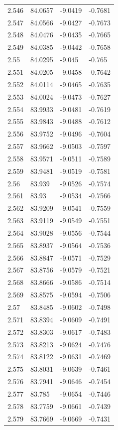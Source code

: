 \begin{tabular}{llll}
2.546 & 84.0657 & -9.0419 & -0.7681 \\
2.547 & 84.0566 & -9.0427 & -0.7673 \\
2.548 & 84.0476 & -9.0435 & -0.7665 \\
2.549 & 84.0385 & -9.0442 & -0.7658 \\
2.55 & 84.0295 & -9.045 & -0.765 \\
2.551 & 84.0205 & -9.0458 & -0.7642 \\
2.552 & 84.0114 & -9.0465 & -0.7635 \\
2.553 & 84.0024 & -9.0473 & -0.7627 \\
2.554 & 83.9933 & -9.0481 & -0.7619 \\
2.555 & 83.9843 & -9.0488 & -0.7612 \\
2.556 & 83.9752 & -9.0496 & -0.7604 \\
2.557 & 83.9662 & -9.0503 & -0.7597 \\
2.558 & 83.9571 & -9.0511 & -0.7589 \\
2.559 & 83.9481 & -9.0519 & -0.7581 \\
2.56 & 83.939 & -9.0526 & -0.7574 \\
2.561 & 83.93 & -9.0534 & -0.7566 \\
2.562 & 83.9209 & -9.0541 & -0.7559 \\
2.563 & 83.9119 & -9.0549 & -0.7551 \\
2.564 & 83.9028 & -9.0556 & -0.7544 \\
2.565 & 83.8937 & -9.0564 & -0.7536 \\
2.566 & 83.8847 & -9.0571 & -0.7529 \\
2.567 & 83.8756 & -9.0579 & -0.7521 \\
2.568 & 83.8666 & -9.0586 & -0.7514 \\
2.569 & 83.8575 & -9.0594 & -0.7506 \\
2.57 & 83.8485 & -9.0602 & -0.7498 \\
2.571 & 83.8394 & -9.0609 & -0.7491 \\
2.572 & 83.8303 & -9.0617 & -0.7483 \\
2.573 & 83.8213 & -9.0624 & -0.7476 \\
2.574 & 83.8122 & -9.0631 & -0.7469 \\
2.575 & 83.8031 & -9.0639 & -0.7461 \\
2.576 & 83.7941 & -9.0646 & -0.7454 \\
2.577 & 83.785 & -9.0654 & -0.7446 \\
2.578 & 83.7759 & -9.0661 & -0.7439 \\
2.579 & 83.7669 & -9.0669 & -0.7431 \\

\end{tabular}
